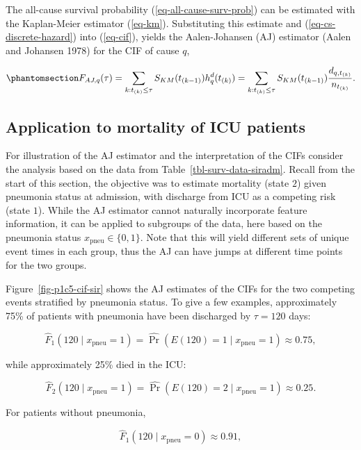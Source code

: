 \documentclass[
  letterpaper,
  krantz2]{style/krantz}
\begin{document}
The all-cause survival probability
(\ref{eq-all-cause-surv-prob}) can be estimated with the Kaplan-Meier
estimator (\ref{eq-km}). Substituting this
estimate and (\ref{eq-cs-discrete-hazard}) into (\ref{eq-cif}), yields
the Aalen-Johansen (AJ) estimator (Aalen
and Johansen 1978) for the CIF of cause \(q\),

\begin{equation}\phantomsection\label{eq-aalen-johansen}{
F_{AJ,q}(\tau) = \sum_{k:t_{(k)}\leq \tau} S_{KM}(t_{(k-1)})h^d_q(t_{(k)})=  \sum_{k:t_{(k)}\leq \tau} S_{KM}(t_{(k-1)})\frac{d_{q,t_{(k)}}}{n_{t_{(k)}}}.
}\end{equation}

\subsection{Application to mortality of ICU
patients}\label{application-to-mortality-of-icu-patients}

For illustration of the AJ estimator and the interpretation of the
CIFs consider the analysis based on
the data from Table~\ref{tbl-surv-data-siradm}. Recall from the start of
this section, the objective was to estimate mortality (state \(2\))
given pneumonia status at admission, with discharge from ICU as a
competing risk (state \(1\)). While the AJ estimator cannot naturally
incorporate feature information, it can be applied to subgroups of the
data, here based on the pneumonia status
\(x_{\text{pneu}} \in \{0,1\}\). Note that this will yield different
sets of unique event times in each group, thus the AJ can have jumps at
different time points for the two groups.

Figure~\ref{fig-p1c5-cif-sir} shows the AJ estimates of the CIFs for the
two competing events stratified by pneumonia status. To give a few
examples, approximately 75\% of patients with pneumonia have been
discharged by \(\tau = 120\) days:

\[
\hat{F}_{1}(120 \mid x_{\text{pneu}}=1) = \widehat{\Pr}(E(120) = 1 \mid x_{\text{pneu}}=1)\approx 0.75,
\]

while approximately 25\% died in the ICU:

\[
\hat{F}_2(120 \mid x_{\text{pneu}}=1) = \widehat{\Pr}(E(120) = 2 \mid x_{\text{pneu}}=1)\approx 0.25.
\]

For patients without pneumonia,

\[
\hat{F}_{1}(120 \mid x_{\text{pneu}}=0) \approx 0.91,
\]
\end{document}

